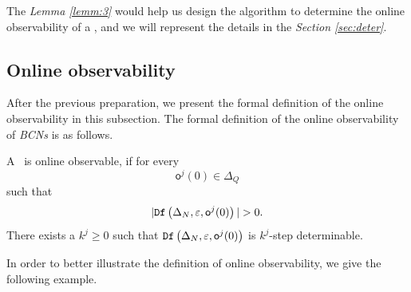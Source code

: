 The {\em Lemma \ref{lemm:3}} would help us design the algorithm to determine the online observability of a \BCN, and we will represent the details in the {\em Section \ref{sec:deter}}.

\subsection{Online observability}
After the previous preparation, we present the formal definition of the online observability in this subsection. The formal definition of the online observability of {\em BCNs} is as follows.

\begin{definition}
 A \BCN\ is online observable,
if for every \[\mathsf{o}^{j}(0)\in \Delta_Q\] such that \[|\Ded\left(\Delta_N,\varepsilon, \mathsf{o}^{j}(0)\right)|> 0.\] There exists a $k^{j}\ge0$ such that ${\tt Df}\left(\Delta_N,\varepsilon,\mathsf{o}^{j}(0)\right)$ is $k^{j}$-step determinable.
\end{definition}


 In order to better illustrate the definition of online observability, we give the following example.

